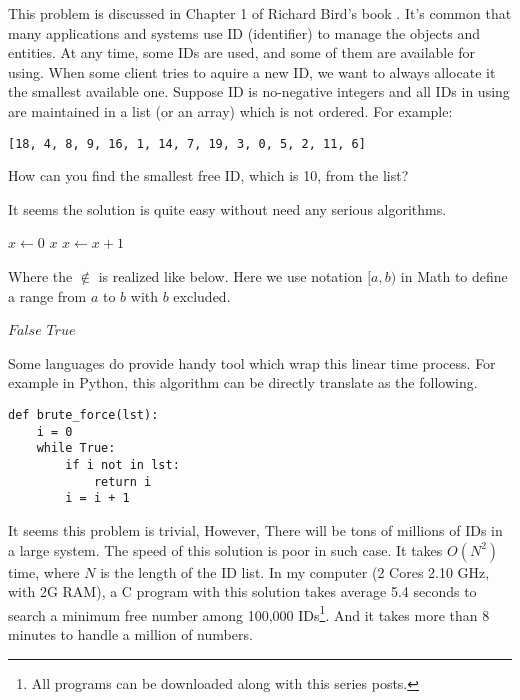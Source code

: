 \documentclass{article}
\begin{document}
This problem is discussed in Chapter 1 of Richard Bird's book \cite{Bird-book}. It's common that many applications and systems use ID (identifier)
to manage the objects and entities. At any time, some IDs are used, and
some of them are available for using. When some client tries to aquire
a new ID, we want to always allocate it the smallest available one.
Suppose ID is no-negative integers and all IDs in using are maintained 
in a list (or an array) which is not ordered. For example:

\begin{verbatim}
[18, 4, 8, 9, 16, 1, 14, 7, 19, 3, 0, 5, 2, 11, 6]
\end{verbatim}

How can you find the smallest free ID, which is 10, from the list?

It seems the solution is quite easy without need any serious algorithms.

\begin{algorithmic}[1]
  \State $x \gets 0$
  \Loop
      \State \Return $x$
    \Else
      \State $x \gets x + 1$
    \EndIf
  \EndLoop
\EndFunction
\end{algorithmic}

Where the $\notin$ is realized like below. Here we use notation $[a, b)$
in Math to define a range from $a$ to $b$ with $b$ excluded.

\begin{algorithmic}[1]
  \For{$i \gets [1, LENGTH(X))$}
      \State \Return $False$
    \EndIf
  \EndFor
  \State \Return $True$
\EndFunction
\end{algorithmic}

Some languages do provide handy tool which wrap this linear time
process. For example in Python, this algorithm can be directly translate
as the following.

\lstset{language=Python}
\begin{lstlisting}
def brute_force(lst):
    i = 0
    while True:
        if i not in lst:
            return i
        i = i + 1
\end{lstlisting}

It seems this problem is trivial, However, There will be tons of millions of
IDs in a large system. The speed of this solution is poor in such case.
It takes $O(N^2)$ time, where $N$ is the length of the ID list.
In my computer (2 Cores 2.10 GHz, with 2G RAM), a C program with this 
solution takes average 5.4 seconds to search a minimum free number 
among 100,000 IDs\footnote{All programs can be downloaded along
with this series posts.}. And it takes more than 8 minutes to handle
a million of numbers.
\end{document}
